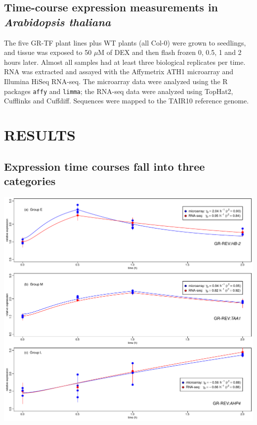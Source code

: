 \documentclass[aspb,landscape]{a0poster}
\newlength{\figwidth}
\newlength{\figtopspace}
\begin{document}
\begin{multicols}{3}
  \subsection*{Time-course expression measurements in {\it Arabidopsis thaliana}}

  The five GR-TF plant lines plus WT plants (all Col-0) were grown to seedlings, and tissue was exposed to 50 $\mu$M of DEX and then flash frozen 0, 0.5, 1 and 2 hours later.
  Almost all samples had at least three biological replicates per time. RNA was extracted and assayed with the Affymetrix ATH1 microarray and Illumina HiSeq RNA-seq.
  The microarray data were analyzed using the R packages \texttt{affy} and \texttt{limma}; the RNA-seq data were analyzed using TopHat2, Cufflinks and Cuffdiff.
  Sequences were mapped to the TAIR10 reference genome. 


  \section*{RESULTS}

  \subsection*{Expression time courses fall into three categories}

  \begin{center}\vspace{\figtopspace}
    \includegraphics[width=\figwidth]{early-middle-late}
  \end{center}


\end{multicols}
\end{document}
